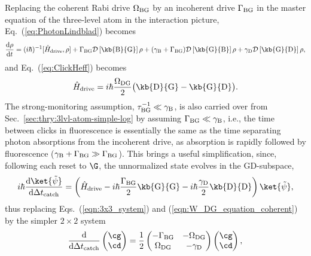 Replacing the coherent Rabi drive $\Omega_{{\rm BG}}$ by an incoherent
drive $\Gamma_{{\rm BG}}$ in  the master equation of the three-level
atom in the interaction picture, Eq.~(\ref{eq:PhotonLindblad}) becomes
\begin{equation}
\frac{\mathrm{d}\rho}{\mathrm{d}t}=(i\hbar)^{-1}[\hat{H}_{{\rm drive}},\rho]+\Gamma_{{\rm BG}}{\cal D}\left[\kb{\rm B}{\rm G}\right]\rho+(\gamma_{{\rm B}}+\Gamma_{{\rm BG}}){\cal D}\left[\kb{\rm G}{\rm B}\right]\rho+\gamma_{{\rm D}}{\cal D}\left[\kb{\rm G}{\rm D}\right]\rho,
\end{equation}
and Eq.~(\ref{eq:ClickHeff}) becomes
\begin{equation}
\hat{H}_{{\rm drive}}=i\hbar\frac{\Omega_{{\rm DG}}}{2}\big(\kb{\rm D}{\rm G}-\kb{\rm G}{\rm D}\big).
\end{equation}
The strong-monitoring assumption, $\tau_{{\rm BG}}^{-1}\ll\gamma_{{\rm B}}$,
is also carried over from Sec.~\ref{sec:thry:3lvl-atom-simple-log}
by assuming $\Gamma_{{\rm BG}}\ll\gamma_{{\rm B}}$, i.e., the time
between clicks in fluorescence is essentially the same as the time
separating photon absorptions from the incoherent drive, as absorption
is rapidly followed by fluorescence ($\gamma_{{\rm B}}+\Gamma_{{\rm BG}}\gg\Gamma_{{\rm BG}}$).
This brings a useful simplification, since, following each reset to
$\G$, the unnormalized state evolves in the GD-subspace, 
\begin{equation}
i\hbar\frac{\mathrm{d}\ket{\tilde{\psi}}}{\mathrm{d}\Delta t_{{\rm catch}}}=\left(\hat{H}_{{\rm drive}}-i\hbar\frac{\Gamma_{{\rm BG}}}{2}\kb{\rm G}{\rm G}-i\hbar\frac{\gamma_{{\rm D}}}{2}\kb{\rm D}{\rm D}\right)\ket{\tilde{\psi}},
\end{equation}
thus replacing Eqs.~(\ref{eqn:3x3_system}) and (\ref{eqn:W_DG_equation_coherent})
by the simpler $2\times2$ system 
\begin{equation}
\frac{\mathrm{d}}{\mathrm{d}\Delta t_{{\rm catch}}}\begin{pmatrix}\cg\\
\cd
\end{pmatrix}=\frac{1}{2}\left(\begin{matrix}-\Gamma_{{\rm BG}} & -\Omega_{{\rm DG}}\\
\Omega_{{\rm DG}} & -\gamma_{{\rm D}}
\end{matrix}\right)\begin{pmatrix}\cg\\
\cd
\end{pmatrix},
\end{equation}
